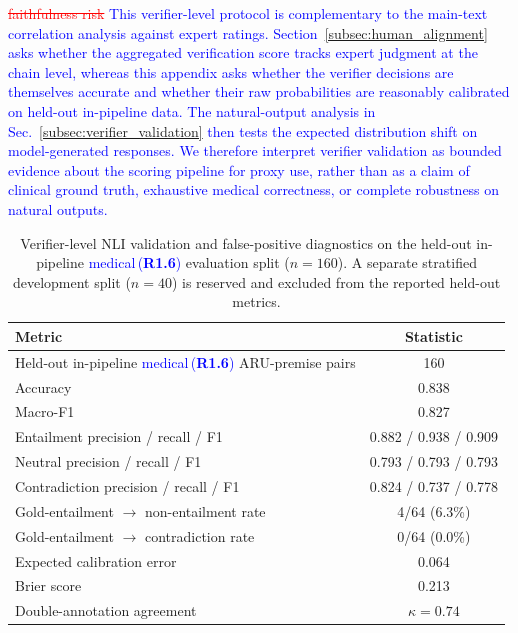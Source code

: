 \documentclass[a4paper,fleqn,doubleblind]{cas-sc}
\DeclareRobustCommand{\deleted}[1]{\textcolor{red}{\sout{#1}}}
\DeclareRobustCommand{\added}[1]{\textcolor{blue}{#1}}
\DeclareRobustCommand{\revtag}[1]{\textcolor{blue}{\scriptsize\,(\textbf{#1})}}
\begin{document}
\deleted{faithfulness risk}
\added{This verifier-level protocol is complementary to the main-text correlation analysis against expert ratings. Section~\ref{subsec:human_alignment} asks whether the aggregated verification score tracks expert judgment at the chain level, whereas this appendix asks whether the verifier decisions are themselves accurate and whether their raw probabilities are reasonably calibrated on held-out in-pipeline data. The natural-output analysis in Sec.~\ref{subsec:verifier_validation} then tests the expected distribution shift on model-generated responses. We therefore interpret verifier validation as bounded evidence about the scoring pipeline for proxy use, rather than as a claim of clinical ground truth, exhaustive medical correctness, or complete robustness on natural outputs.}

\begin{table}[htbp]
    \centering
    \begingroup\color{blue}
    \caption{Verifier-level NLI validation and false-positive diagnostics on the held-out in-pipeline \added{medical}\revtag{R1.6} evaluation split ($n=160$). A separate stratified development split ($n=40$) is reserved and excluded from the reported held-out metrics.}
    \label{tab:nli_validation_template}
    \begin{tabular}{lc}
        \toprule
        \textbf{Metric} & \textbf{Statistic} \\
        \midrule
        Held-out in-pipeline \added{medical}\revtag{R1.6} ARU-premise pairs & 160 \\
        Accuracy & 0.838 \\
        Macro-F1 & 0.827 \\
        Entailment precision / recall / F1 & 0.882 / 0.938 / 0.909 \\
        Neutral precision / recall / F1 & 0.793 / 0.793 / 0.793 \\
        Contradiction precision / recall / F1 & 0.824 / 0.737 / 0.778 \\
        Gold-entailment $\rightarrow$ non-entailment rate & 4/64 (6.3\%) \\
        Gold-entailment $\rightarrow$ contradiction rate & 0/64 (0.0\%) \\
        Expected calibration error & 0.064 \\
        Brier score & 0.213 \\
        Double-annotation agreement & $\kappa=0.74$ \\
        \bottomrule
    \end{tabular}
    \endgroup
\end{table}
\end{document}
